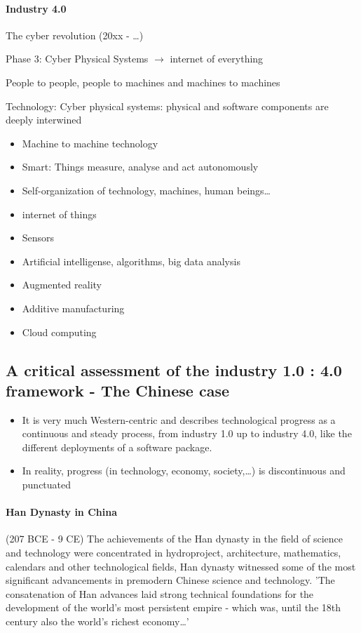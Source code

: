 \paragraph{Industry 4.0} The cyber revolution (20xx - \dots)

Phase 3: Cyber Physical Systems $\rightarrow$ internet of everything

\vspace{1\baselineskip}

People to people, people to machines and machines to machines

\vspace{1\baselineskip}

Technology: Cyber physical systems: physical and software components are
deeply interwined
\begin{itemize}
    \item Machine to machine technology
    \item Smart: Things measure, analyse and act autonomously
    \item Self-organization of technology, machines, human beings\dots
    \item internet of things
    \item Sensors
    \item Artificial intelligense, algorithms, big data analysis
    \item Augmented reality
    \item Additive manufacturing
    \item Cloud computing
\end{itemize}

\subsection{A critical assessment of the industry 1.0 : 4.0 framework - The
Chinese case}

\begin{itemize}
    \item It is very much Western-centric and describes technological progress
        as a continuous and steady process, from industry 1.0 up to industry
        4.0, like the different deployments of a software package.
    \item In reality, progress (in technology, economy, society,\dots) is
        discontinuous and punctuated
\end{itemize}

\paragraph{Han Dynasty in China} (207 BCE - 9 CE) The achievements of the Han
dynasty in the field of science and technology were concentrated in hydroproject,
architecture, mathematics, calendars and other technological fields, Han dynasty
witnessed some of the most significant advancements in premodern Chinese science
and technology. 'The consatenation of Han advances laid strong technical foundations
for the development of the world's most persistent empire - which was, until the
18th century also the world's richest economy\dots'

